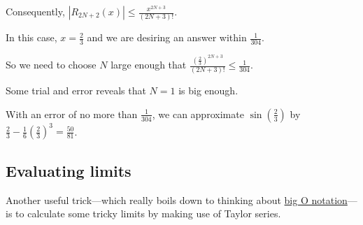 \documentclass{ximera}
\begin{document}
\begin{question}
\begin{solution}
                \begin{hint}
                  Consequently, \(|R_{2N+2}(x)| \leq \displaystyle\frac{x^{2N+3} }{(2N+3)!}\).
                \end{hint}
                \begin{hint}
                  In this case, \(x = \displaystyle\frac{2}{3}\) and we are desiring an answer within \(\displaystyle\frac{1}{304}\).
                \end{hint}
                \begin{hint}
                  So we need to choose \(N\) large enough that \(\displaystyle\frac{\left(\displaystyle\frac{2}{3}\right)^{2N+3} }{(2N+3)!} \leq \displaystyle\frac{1}{304}\).
                \end{hint}
                \begin{hint}
                  Some trial and error reveals that \(N = 1\) is big enough.
                \end{hint}
                \begin{hint}
                  With an error of no more than \(\displaystyle\frac{1}{304}\), we can approximate \(\sin \left(\displaystyle\frac{2}{3}\right)\) by \(\displaystyle\frac{2}{3} - \displaystyle\frac{1}{6} \left(\displaystyle\frac{2}{3}\right)^3 = \displaystyle\frac{50}{81}\).

                \end{hint}


              \begin{multiple-choice}

              \end{multiple-choice}

              \end{solution}
            \end{question}
            
\subsection{Evaluating limits}

Another useful trick---which really boils down to thinking about  \href{http://en.wikipedia.org/wiki/Big_O_notation}{big O notation}---is to calculate some tricky limits by making use of Taylor series.
\end{document}
